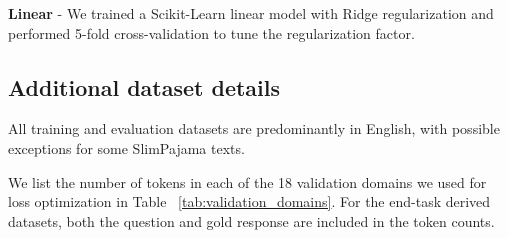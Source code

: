 \noindent \textbf{Linear} - We trained a Scikit-Learn linear model with Ridge regularization and performed 5-fold cross-validation to tune the regularization factor.

\subsection{Additional dataset details}
\label{sec:appendix_data}



All training and evaluation datasets are predominantly in English, with possible exceptions for some SlimPajama texts.


We list the number of tokens in each of the 18 validation domains we used for loss optimization in Table ~\ref{tab:validation_domains}. For the end-task derived datasets, both the question and gold response are included in the token counts.


\begin{table}[htbp]
\begin{center}
\begin{small}
\begin{sc}
\end{sc}
\end{small}
\end{center}
\caption{Number of tokens in validation domains used for loss prediction and optimization.}
\label{tab:validation_domains}
\end{table}


